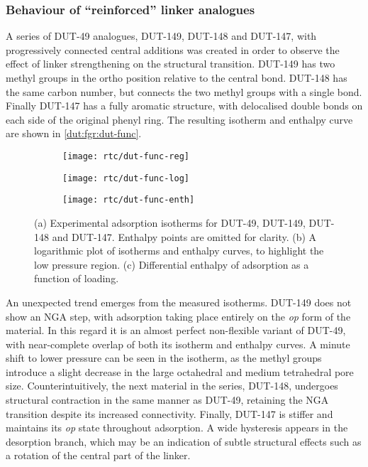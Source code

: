 \subsubsection{Behaviour of ``reinforced'' linker analogues}

A series of DUT-49 analogues, DUT-149, DUT-148 and DUT-147, 
with progressively connected central additions was created in
order to observe the effect of linker strengthening on the 
structural transition. DUT-149 has two methyl groups in the 
ortho position relative to the central bond. DUT-148 has 
the same carbon number, but connects the two methyl groups
with a single bond. Finally DUT-147 has a fully aromatic
structure, with delocalised double bonds on each side of the 
original phenyl ring. The resulting isotherm and enthalpy 
curve are shown in \autoref{dut:fgr:dut-func}.

\begin{figure}[htb]
    \centering
    \begin{subfigure}{0.33\linewidth}
        \texttt{[image: rtc/dut-func-reg]}%
        \caption{}\label{dut:fgr:dut-func-reg}
    \end{subfigure}%
    \begin{subfigure}{0.33\linewidth}
        \texttt{[image: rtc/dut-func-log]}%
        \caption{}\label{dut:fgr:dut-func-log}
    \end{subfigure}%
    \begin{subfigure}{0.33\linewidth}
        \texttt{[image: rtc/dut-func-enth]}%
        \caption{}\label{dut:fgr:dut-func-enth}
    \end{subfigure}%
    \caption{(a) Experimental adsorption isotherms for DUT-49, DUT-149,
    DUT-148 and DUT-147. Enthalpy points are omitted for clarity. 
    (b) A logarithmic plot of isotherms and enthalpy curves,
    to highlight the low pressure region. 
    (c) Differential enthalpy of adsorption as a function of loading.}%
    \label{dut:fgr:dut-func}
\end{figure}

An unexpected trend emerges from the measured isotherms. DUT-149
does not show an NGA step, with adsorption taking place entirely
on the \textit{op} form of the material. In this regard it is
an almost perfect non-flexible variant of DUT-49, with near-complete
overlap of both its isotherm and enthalpy curves. A minute 
shift to lower pressure can be seen in the isotherm, as the 
methyl groups introduce a slight decrease in the large octahedral
and medium tetrahedral pore size. Counterintuitively, the next material
in the series, DUT-148, undergoes structural contraction in the
same manner as DUT-49, retaining the NGA transition despite its 
increased connectivity. Finally, DUT-147 is stiffer and maintains
its \textit{op} state throughout adsorption. A wide hysteresis
appears in the desorption branch, which may be an indication of 
subtle structural effects such as a rotation of the central part
of the linker.

